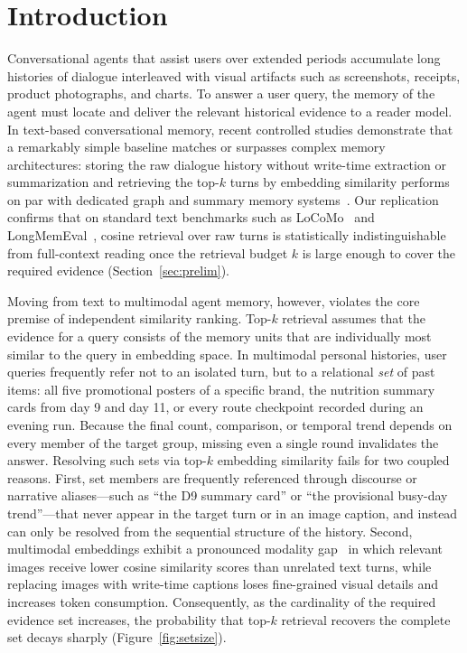\documentclass[10pt]{article}
\begin{document}
\section{Introduction}
\label{sec:intro}

Conversational agents that assist users over extended periods accumulate long histories of dialogue interleaved with visual artifacts such as screenshots, receipts, product photographs, and charts. To answer a user query, the memory of the agent must locate and deliver the relevant historical evidence to a reader model. In text-based conversational memory, recent controlled studies demonstrate that a remarkably simple baseline matches or surpasses complex memory architectures: storing the raw dialogue history without write-time extraction or summarization and retrieving the top-$k$ turns by embedding similarity performs on par with dedicated graph and summary memory systems~\citep{bao2026rawrag,zhou2026explicit,sharma2026selection,peng2026memorytax}. Our replication confirms that on standard text benchmarks such as LoCoMo~\citep{maharana2024locomo} and LongMemEval~\citep{wu2025longmemeval}, cosine retrieval over raw turns is statistically indistinguishable from full-context reading once the retrieval budget $k$ is large enough to cover the required evidence (Section~\ref{sec:prelim}).

Moving from text to multimodal agent memory, however, violates the core premise of independent similarity ranking. Top-$k$ retrieval assumes that the evidence for a query consists of the memory units that are individually most similar to the query in embedding space. In multimodal personal histories, user queries frequently refer not to an isolated turn, but to a relational \emph{set} of past items: all five promotional posters of a specific brand, the nutrition summary cards from day 9 and day 11, or every route checkpoint recorded during an evening run. Because the final count, comparison, or temporal trend depends on every member of the target group, missing even a single round invalidates the answer. Resolving such sets via top-$k$ embedding similarity fails for two coupled reasons. First, set members are frequently referenced through discourse or narrative aliases—such as ``the D9 summary card'' or ``the provisional busy-day trend''—that never appear in the target turn or in an image caption, and instead can only be resolved from the sequential structure of the history. Second, multimodal embeddings exhibit a pronounced modality gap~\citep{liang2022modalitygap} in which relevant images receive lower cosine similarity scores than unrelated text turns, while replacing images with write-time captions loses fine-grained visual details and increases token consumption. Consequently, as the cardinality of the required evidence set increases, the probability that top-$k$ retrieval recovers the complete set decays sharply (Figure~\ref{fig:setsize}).
\end{document}
